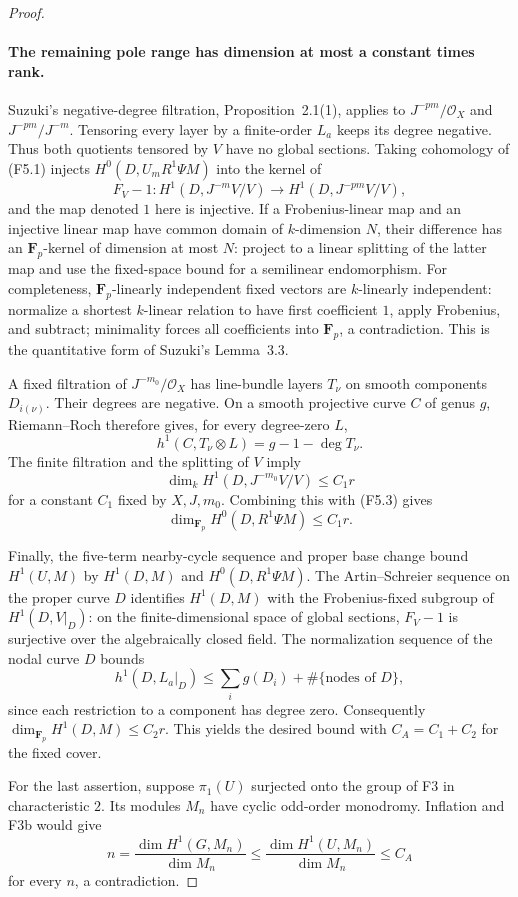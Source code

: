 \begin{proof}
\paragraph{The remaining pole range has dimension at most a constant times rank.}
Suzuki's negative-degree filtration, Proposition~2.1(1), applies to
$J^{-pm}/\mathcal O_X$ and $J^{-pm}/J^{-m}$. Tensoring every layer
by a finite-order $L_a$ keeps its degree negative. Thus both
quotients tensored by $V$ have no global sections. Taking cohomology
of (F5.1) injects $H^0(D,U_mR^1\Psi M)$ into the kernel of
\[
 F_V-1:H^1(D,J^{-m}V/V)\longrightarrow
                    H^1(D,J^{-pm}V/V),
\]
and the map denoted $1$ here is injective. If a Frobenius-linear
map and an injective linear map have common domain of $k$-dimension
$N$, their difference has an $\mathbf F_p$-kernel of dimension at
most $N$: project to a linear splitting of the latter map and use
the fixed-space bound for a semilinear endomorphism. For completeness,
$\mathbf F_p$-linearly independent fixed vectors are $k$-linearly
independent: normalize a shortest $k$-linear relation to have first
coefficient $1$, apply Frobenius, and subtract; minimality forces
all coefficients into $\mathbf F_p$, a contradiction. This is the
quantitative form of Suzuki's Lemma~3.3.

A fixed filtration of $J^{-m_0}/\mathcal O_X$ has line-bundle layers
$T_\nu$ on smooth components $D_{i(\nu)}$. Their degrees are
negative. On a smooth projective curve $C$ of genus $g$, Riemann--Roch
therefore gives, for every degree-zero $L$,
\[
 h^1(C,T_\nu\otimes L)=g-1-\deg T_\nu.
\]
The finite filtration and the splitting of $V$ imply
\[
 \dim_k H^1(D,J^{-m_0}V/V)\leq C_1r
\]
for a constant $C_1$ fixed by $X,J,m_0$. Combining this with
(F5.3) gives
\[
 \dim_{\mathbf F_p}H^0(D,R^1\Psi M)\leq C_1r.
\]

Finally, the five-term nearby-cycle sequence and proper base change
bound $H^1(U,M)$ by $H^1(D,M)$ and $H^0(D,R^1\Psi M)$.
The Artin--Schreier sequence on the proper curve $D$ identifies
$H^1(D,M)$ with the Frobenius-fixed subgroup of $H^1(D,V|_D)$: on the finite-dimensional space of
global sections, $F_V-1$ is surjective over the algebraically closed
field. The normalization sequence of the nodal curve $D$ bounds
\[
 h^1(D,L_a|_D)\leq\sum_i g(D_i)+\#\{\text{nodes of }D\},
\]
since each restriction to a component has degree zero. Consequently
$\dim_{\mathbf F_p}H^1(D,M)\leq C_2r$. This yields the desired
bound with $C_A=C_1+C_2$ for the fixed cover.

For the last assertion, suppose $\pi_1(U)$ surjected onto the group
of F3 in characteristic $2$. Its modules $M_n$ have cyclic odd-order
monodromy. Inflation and F3b would give
\[
 n=\frac{\dim H^1(G,M_n)}{\dim M_n}
 \leq\frac{\dim H^1(U,M_n)}{\dim M_n}\leq C_A
\]
for every $n$, a contradiction.
\end{proof}

